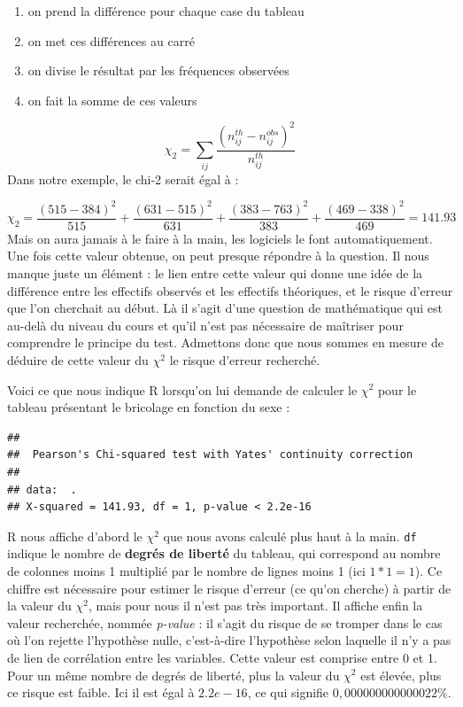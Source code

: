 \documentclass[
  french,
]{book}
\newenvironment{Shaded}{\begin{snugshade}}{\end{snugshade}}
\newcommand{\FunctionTok}[1]{\textcolor[rgb]{0.00,0.00,0.00}{#1}}
\newcommand{\NormalTok}[1]{#1}
\newcommand{\SpecialCharTok}[1]{\textcolor[rgb]{0.00,0.00,0.00}{#1}}
\providecommand{\tightlist}{%
  \setlength{\itemsep}{0pt}\setlength{\parskip}{0pt}}
\begin{document}
\begin{enumerate}
\def\labelenumi{\arabic{enumi}.}
\tightlist
\item
  on prend la différence pour chaque case du tableau
\item
  on met ces différences au carré
\item
  on divise le résultat par les fréquences observées
\item
  on fait la somme de ces valeurs
\end{enumerate}

\[\chi_2 = \sum_{ij} \frac{(n^{th}_{ij} - n^{obs}_{ij})^2}{n^{th}_{ij}}\]
Dans notre exemple, le chi-2 serait égal à :

\[ \chi_2 = \frac{(515-384)^2}{515} + \frac{(631-515)^2}{631}+\frac{(383-763)^2}{383} + \frac{(469-338)^2}{469} = 141.93 \]
Mais on aura jamais à le faire à la main, les logiciels le font automatiquement. Une fois cette valeur obtenue, on peut presque répondre à la question. Il nous manque juste un élément : le lien entre cette valeur qui donne une idée de la différence entre les effectifs observés et les effectifs théoriques, et le risque d'erreur que l'on cherchait au début. Là il s'agit d'une question de mathématique qui est au-delà du niveau du cours et qu'il n'est pas nécessaire de maîtriser pour comprendre le principe du test. Admettons donc que nous sommes en mesure de déduire de cette valeur du \(\chi^2\) le risque d'erreur recherché.

Voici ce que nous indique R lorsqu'on lui demande de calculer le \(\chi^2\) pour le tableau présentant le bricolage en fonction du sexe :

\begin{Shaded}
\end{Shaded}

\begin{verbatim}
## 
##  Pearson's Chi-squared test with Yates' continuity correction
## 
## data:  .
## X-squared = 141.93, df = 1, p-value < 2.2e-16
\end{verbatim}

R nous affiche d'abord le \(\chi^2\) que nous avons calculé plus haut à la main. \texttt{df} indique le nombre de \textbf{degrés de liberté} du tableau, qui correspond au nombre de colonnes moins 1 multiplié par le nombre de lignes moins 1 (ici \(1*1=1\)). Ce chiffre est nécessaire pour estimer le risque d'erreur (ce qu'on cherche) à partir de la valeur du \(\chi^2\), mais pour nous il n'est pas très important. Il affiche enfin la valeur recherchée, nommée \emph{p-value} : il s'agit du risque de se tromper dans le cas où l'on rejette l'hypothèse nulle, c'est-à-dire l'hypothèse selon laquelle il n'y a pas de lien de corrélation entre les variables. Cette valeur est comprise entre 0 et 1. Pour un même nombre de degrés de liberté, plus la valeur du \(\chi^2\) est élevée, plus ce risque est faible. Ici il est égal à \(2.2e-16\), ce qui signifie \(0,000000000000022 \%\).
\end{document}

